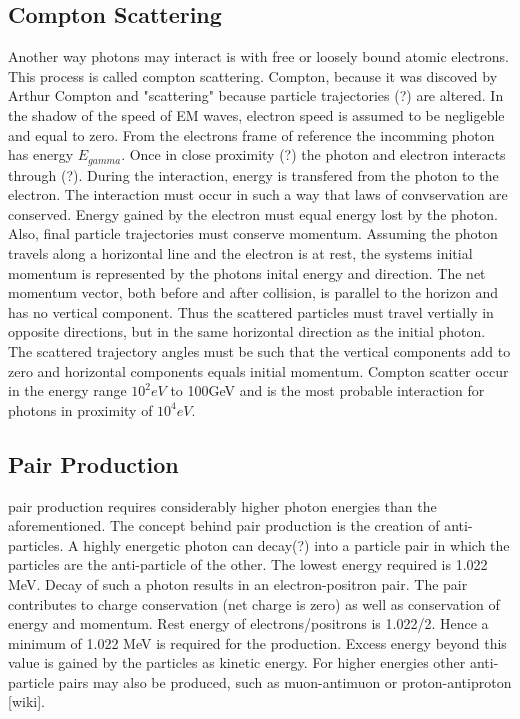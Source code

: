 \subsection{Compton Scattering}
Another way photons may interact is with free or loosely bound atomic electrons. This process is called compton scattering. Compton, because it was discoved by Arthur Compton and "scattering" because particle trajectories (?) are altered. In the shadow of the speed of EM waves, electron speed is assumed to be negligeble and equal to zero. From the electrons frame of reference the incomming photon has energy $E_{gamma}$. Once in close proximity (?) the photon and electron interacts through (?). During the interaction, energy is transfered from the photon to the electron. The interaction must occur in such a way that laws of convservation are conserved. Energy gained by the electron must equal energy lost by the photon. Also, final particle trajectories must conserve momentum. Assuming the photon travels along a horizontal line and the electron is at rest, the systems initial momentum is represented by the photons inital energy and direction. The net momentum vector, both before and after collision,  is parallel to the horizon and has no vertical component. Thus the scattered particles must travel vertially in opposite directions, but in the same horizontal direction as the initial photon. The scattered trajectory angles must be such that the vertical components add to zero and horizontal components equals initial momentum.
Compton scatter occur in the energy range $10^2eV$ to 100GeV and is the most probable interaction for photons in proximity of $10^4eV$.



\subsection{Pair Production }
pair production requires considerably higher photon energies than the aforementioned. The concept behind pair production is the creation of anti-particles. A highly energetic photon can decay(?) into a particle pair in which the particles are the anti-particle of the other. The lowest energy required is 1.022 MeV. Decay of such a photon results in an electron-positron pair. The pair contributes to charge conservation (net charge is zero) as well as conservation of energy and momentum. Rest energy of electrons/positrons is 1.022/2. Hence a minimum of 1.022 MeV is required for the production. Excess energy beyond this value is gained by the particles as kinetic energy. For higher energies other anti-particle pairs may also be produced, such as muon-antimuon or proton-antiproton [wiki].

